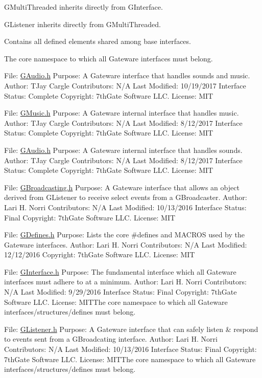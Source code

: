 G\+Multi\+Threaded inherits directly from G\+Interface.

G\+Listener inherits directly from G\+Multi\+Threaded.

Contains all defined elements shared among base interfaces.

The core namespace to which all Gateware interfaces must belong.

File\+: \mbox{\hyperlink{_g_audio_8h_source}{G\+Audio.\+h}} Purpose\+: A Gateware interface that handles sounds and music. Author\+: T\+Jay Cargle Contributors\+: N/A Last Modified\+: 10/19/2017 Interface Status\+: Complete Copyright\+: 7th\+Gate Software L\+LC. License\+: M\+IT

File\+: \mbox{\hyperlink{_g_music_8h_source}{G\+Music.\+h}} Purpose\+: A Gateware internal interface that handles music. Author\+: T\+Jay Cargle Contributors\+: N/A Last Modified\+: 8/12/2017 Interface Status\+: Complete Copyright\+: 7th\+Gate Software L\+LC. License\+: M\+IT

File\+: \mbox{\hyperlink{_g_audio_8h_source}{G\+Audio.\+h}} Purpose\+: A Gateware internal interface that handles sounds. Author\+: T\+Jay Cargle Contributors\+: N/A Last Modified\+: 8/12/2017 Interface Status\+: Complete Copyright\+: 7th\+Gate Software L\+LC. License\+: M\+IT

File\+: \mbox{\hyperlink{_g_broadcasting_8h_source}{G\+Broadcasting.\+h}} Purpose\+: A Gateware interface that allows an object derived from G\+Listener to receive select events from a G\+Broadcaster. Author\+: Lari H. Norri Contributors\+: N/A Last Modified\+: 10/13/2016 Interface Status\+: Final Copyright\+: 7th\+Gate Software L\+LC. License\+: M\+IT

File\+: \mbox{\hyperlink{_g_defines_8h_source}{G\+Defines.\+h}} Purpose\+: Lists the core \#defines and M\+A\+C\+R\+OS used by the Gateware interfaces. Author\+: Lari H. Norri Contributors\+: N/A Last Modified\+: 12/12/2016 Copyright\+: 7th\+Gate Software L\+LC. License\+: M\+IT

File\+: \mbox{\hyperlink{_g_interface_8h_source}{G\+Interface.\+h}} Purpose\+: The fundamental interface which all Gateware interfaces must adhere to at a minimum. Author\+: Lari H. Norri Contributors\+: N/A Last Modified\+: 9/29/2016 Interface Status\+: Final Copyright\+: 7th\+Gate Software L\+LC. License\+: M\+I\+T\+The core namespace to which all Gateware interfaces/structures/defines must belong.

File\+: \mbox{\hyperlink{_g_listener_8h_source}{G\+Listener.\+h}} Purpose\+: A Gateware interface that can safely listen \& respond to events sent from a G\+Broadcating interface. Author\+: Lari H. Norri Contributors\+: N/A Last Modified\+: 10/13/2016 Interface Status\+: Final Copyright\+: 7th\+Gate Software L\+LC. License\+: M\+I\+T\+The core namespace to which all Gateware interfaces/structures/defines must belong.

